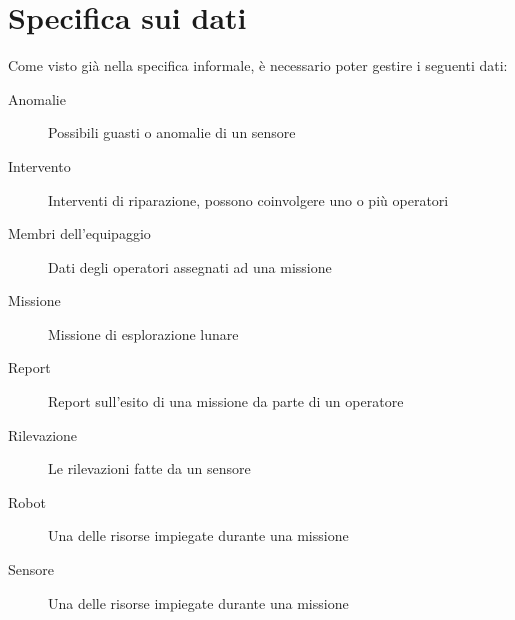 \section{Specifica sui dati}
Come visto già nella specifica informale, è necessario poter gestire i seguenti dati:
\begin{description}
\item[Anomalie] Possibili guasti o anomalie di un sensore
\item[Intervento] Interventi di riparazione, possono coinvolgere uno o più operatori
\item[Membri dell'equipaggio] Dati degli operatori assegnati ad una missione
\item[Missione] Missione di esplorazione lunare
\item[Report] Report sull'esito di una missione da parte di un operatore
\item[Rilevazione] Le rilevazioni fatte da un sensore
\item[Robot] Una delle risorse impiegate durante una missione
\item[Sensore] Una delle risorse impiegate durante una missione
\end{description}

